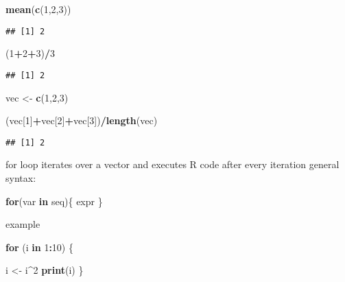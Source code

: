 \documentclass[
]{article}
\newenvironment{Shaded}{\begin{snugshade}}{\end{snugshade}}
\newcommand{\ControlFlowTok}[1]{\textcolor[rgb]{0.13,0.29,0.53}{\textbf{#1}}}
\newcommand{\DecValTok}[1]{\textcolor[rgb]{0.00,0.00,0.81}{#1}}
\newcommand{\FunctionTok}[1]{\textcolor[rgb]{0.13,0.29,0.53}{\textbf{#1}}}
\newcommand{\NormalTok}[1]{#1}
\newcommand{\OtherTok}[1]{\textcolor[rgb]{0.56,0.35,0.01}{#1}}
\newcommand{\SpecialCharTok}[1]{\textcolor[rgb]{0.81,0.36,0.00}{\textbf{#1}}}
\begin{document}
\begin{Shaded}
\begin{Highlighting}[]
\FunctionTok{mean}\NormalTok{(}\FunctionTok{c}\NormalTok{(}\DecValTok{1}\NormalTok{,}\DecValTok{2}\NormalTok{,}\DecValTok{3}\NormalTok{))}
\end{Highlighting}
\end{Shaded}

\begin{verbatim}
## [1] 2
\end{verbatim}

\begin{Shaded}
\begin{Highlighting}[]
\NormalTok{(}\DecValTok{1}\SpecialCharTok{+}\DecValTok{2}\SpecialCharTok{+}\DecValTok{3}\NormalTok{)}\SpecialCharTok{/}\DecValTok{3}
\end{Highlighting}
\end{Shaded}

\begin{verbatim}
## [1] 2
\end{verbatim}

\begin{Shaded}
\begin{Highlighting}[]
\NormalTok{vec }\OtherTok{\textless{}{-}} \FunctionTok{c}\NormalTok{(}\DecValTok{1}\NormalTok{,}\DecValTok{2}\NormalTok{,}\DecValTok{3}\NormalTok{)}

\NormalTok{(vec[}\DecValTok{1}\NormalTok{]}\SpecialCharTok{+}\NormalTok{vec[}\DecValTok{2}\NormalTok{]}\SpecialCharTok{+}\NormalTok{vec[}\DecValTok{3}\NormalTok{])}\SpecialCharTok{/}\FunctionTok{length}\NormalTok{(vec)}
\end{Highlighting}
\end{Shaded}

\begin{verbatim}
## [1] 2
\end{verbatim}

for loop iterates over a vector and executes R code after every
iteration general syntax:

\begin{Shaded}
\begin{Highlighting}[]
\ControlFlowTok{for}\NormalTok{(var }\ControlFlowTok{in}\NormalTok{ seq)\{}
\NormalTok{  expr}
\NormalTok{\}}
\end{Highlighting}
\end{Shaded}

example

\begin{Shaded}
\begin{Highlighting}[]
\ControlFlowTok{for}\NormalTok{ (i }\ControlFlowTok{in} \DecValTok{1}\SpecialCharTok{:}\DecValTok{10}\NormalTok{) \{}
  
\NormalTok{  i }\OtherTok{\textless{}{-}}\NormalTok{ i}\SpecialCharTok{\^{}}\DecValTok{2}
  \FunctionTok{print}\NormalTok{(i)}
\NormalTok{\}}
\end{Highlighting}
\end{Shaded}
\end{document}
